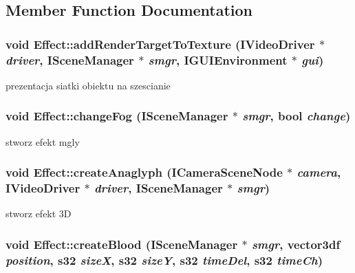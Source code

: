 \subsection{Member Function Documentation}
\hypertarget{class_effect_a9074339b40d0ed9a652317d72e271cb9}{
\subsubsection[{addRenderTargetToTexture}]{\setlength{\rightskip}{0pt plus 5cm}void Effect::addRenderTargetToTexture (IVideoDriver $\ast$ {\em driver}, \/  ISceneManager $\ast$ {\em smgr}, \/  IGUIEnvironment $\ast$ {\em gui})}}
\label{class_effect_a9074339b40d0ed9a652317d72e271cb9}
prezentacja siatki obiektu na szescianie \hypertarget{class_effect_a19342fd47bfcfa672249faee1f2ed646}{
\subsubsection[{changeFog}]{\setlength{\rightskip}{0pt plus 5cm}void Effect::changeFog (ISceneManager $\ast$ {\em smgr}, \/  bool {\em change})}}
\label{class_effect_a19342fd47bfcfa672249faee1f2ed646}
stworz efekt mgly \hypertarget{class_effect_a0704d97e705b722eec5fd93244ae6bcd}{
\subsubsection[{createAnaglyph}]{\setlength{\rightskip}{0pt plus 5cm}void Effect::createAnaglyph (ICameraSceneNode $\ast$ {\em camera}, \/  IVideoDriver $\ast$ {\em driver}, \/  ISceneManager $\ast$ {\em smgr})}}
\label{class_effect_a0704d97e705b722eec5fd93244ae6bcd}
stworz efekt 3D \hypertarget{class_effect_a7e891cfd00f2b84413f07b27b733cca7}{
\subsubsection[{createBlood}]{\setlength{\rightskip}{0pt plus 5cm}void Effect::createBlood (ISceneManager $\ast$ {\em smgr}, \/  vector3df {\em position}, \/  s32 {\em sizeX}, \/  s32 {\em sizeY}, \/  s32 {\em timeDel}, \/  s32 {\em timeCh})}}
